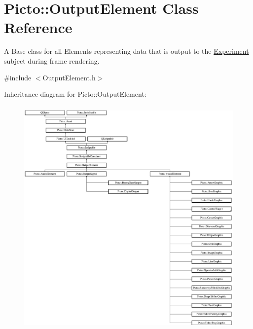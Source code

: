 \hypertarget{class_picto_1_1_output_element}{\section{Picto\-:\-:Output\-Element Class Reference}
\label{class_picto_1_1_output_element}
}


A Base class for all Elements representing data that is output to the \hyperlink{class_picto_1_1_experiment}{Experiment} subject during frame rendering.  




{\ttfamily \#include $<$Output\-Element.\-h$>$}

Inheritance diagram for Picto\-:\-:Output\-Element\-:\begin{figure}[H]
\begin{center}
\leavevmode
\includegraphics[height=12.000000cm]{class_picto_1_1_output_element}
\end{center}
\end{figure}
